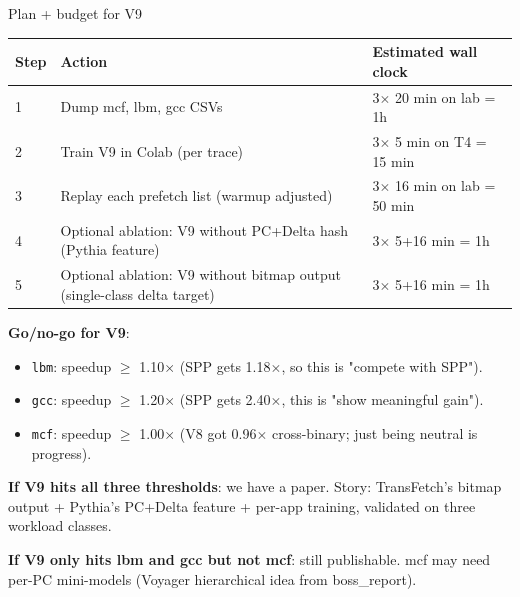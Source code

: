 \documentclass[10pt,aspectratio=169]{beamer}
\begin{document}
\begin{frame}{Plan + budget for V9}
  \footnotesize
  \begin{center}
  \scriptsize
  \begin{tabular}{p{1.0cm}p{4.6cm}p{6.5cm}}
    \toprule
    \textbf{Step} & \textbf{Action} & \textbf{Estimated wall clock} \\
    \midrule
    1 & Dump mcf, lbm, gcc CSVs                 & 3$\times$ 20 min on lab = 1h \\
    2 & Train V9 in Colab (per trace)           & 3$\times$ 5 min on T4 = 15 min \\
    3 & Replay each prefetch list (warmup adjusted) & 3$\times$ 16 min on lab = 50 min \\
    4 & Optional ablation: V9 without PC+Delta hash (Pythia feature) & 3$\times$ 5+16 min = 1h \\
    5 & Optional ablation: V9 without bitmap output (single-class delta target) & 3$\times$ 5+16 min = 1h \\
    \bottomrule
  \end{tabular}
  \end{center}

  \vspace{0.5em}
  \textbf{Go/no-go for V9}:
  \begin{itemize}\scriptsize
    \item \texttt{lbm}: speedup $\geq$ 1.10$\times$ (SPP gets 1.18$\times$, so this is "compete with SPP").
    \item \texttt{gcc}: speedup $\geq$ 1.20$\times$ (SPP gets 2.40$\times$, this is "show meaningful gain").
    \item \texttt{mcf}: speedup $\geq$ 1.00$\times$ (V8 got 0.96$\times$ cross-binary; just being neutral is progress).
  \end{itemize}

  \vspace{0.4em}
  \textbf{If V9 hits all three thresholds}: we have a paper. Story: TransFetch's
  bitmap output + Pythia's PC+Delta feature + per-app training, validated on three
  workload classes.

  \vspace{0.4em}
  \textbf{If V9 only hits lbm and gcc but not mcf}: still publishable. mcf may need
  per-PC mini-models (Voyager hierarchical idea from boss\_report).
\end{frame}
\end{document}
